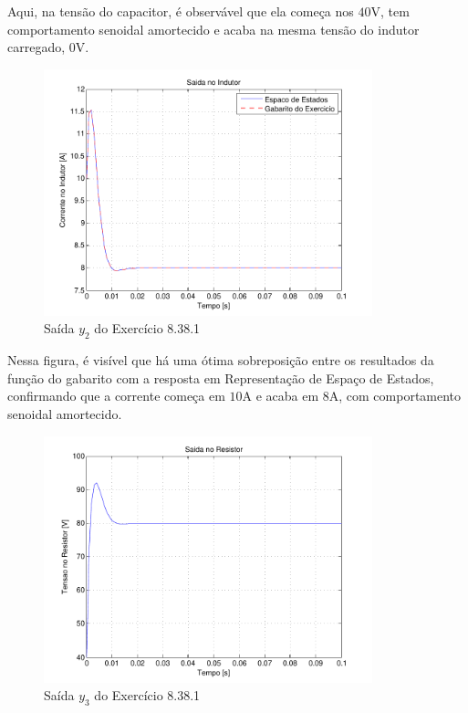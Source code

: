 \documentclass{report}
\begin{document}
Aqui, na tensão do capacitor, é observável que ela começa nos $ 40\text{V} $, tem comportamento senoidal amortecido e
acaba na mesma tensão do indutor carregado, $ 0\text{V} $.
\clearpage
\begin{figure}[h!]
    \centering
    \includegraphics[width=0.85\textwidth]{images/plots/plot_8_38_1_y2.pdf}
    \caption{\label{plot:8.38.1_y2} Saída $ y_2 $ do Exercício 8.38.1}
\end{figure}

Nessa figura, é visível que há uma ótima sobreposição entre os resultados da função do gabarito com a resposta em Representação de Espaço de Estados, confirmando
que a corrente começa em $ 10\text{A} $ e acaba em $ 8\text{A} $, com comportamento senoidal amortecido.

\begin{figure}[h!]
    \centering
    \includegraphics[width=0.85\textwidth]{images/plots/plot_8_38_1_y3.pdf}
    \caption{\label{plot:8.38.1_y3} Saída $ y_3 $ do Exercício 8.38.1}
\end{figure}
\end{document}
